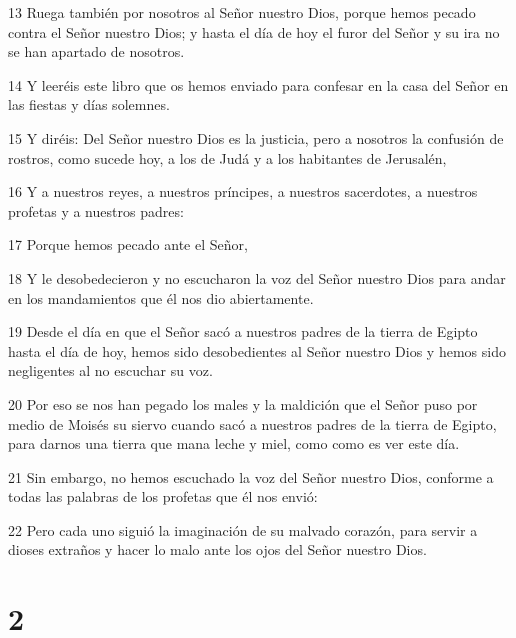 \par 13 Ruega también por nosotros al Señor nuestro Dios, porque hemos pecado contra el Señor nuestro Dios; y hasta el día de hoy el furor del Señor y su ira no se han apartado de nosotros.
\par 14 Y leeréis este libro que os hemos enviado para confesar en la casa del Señor en las fiestas y días solemnes.
\par 15 Y diréis: Del Señor nuestro Dios es la justicia, pero a nosotros la confusión de rostros, como sucede hoy, a los de Judá y a los habitantes de Jerusalén,
\par 16 Y a nuestros reyes, a nuestros príncipes, a nuestros sacerdotes, a nuestros profetas y a nuestros padres:
\par 17 Porque hemos pecado ante el Señor,
\par 18 Y le desobedecieron y no escucharon la voz del Señor nuestro Dios para andar en los mandamientos que él nos dio abiertamente.
\par 19 Desde el día en que el Señor sacó a nuestros padres de la tierra de Egipto hasta el día de hoy, hemos sido desobedientes al Señor nuestro Dios y hemos sido negligentes al no escuchar su voz.
\par 20 Por eso se nos han pegado los males y la maldición que el Señor puso por medio de Moisés su siervo cuando sacó a nuestros padres de la tierra de Egipto, para darnos una tierra que mana leche y miel, como como es ver este día.
\par 21 Sin embargo, no hemos escuchado la voz del Señor nuestro Dios, conforme a todas las palabras de los profetas que él nos envió:
\par 22 Pero cada uno siguió la imaginación de su malvado corazón, para servir a dioses extraños y hacer lo malo ante los ojos del Señor nuestro Dios.

\chapter{2}

